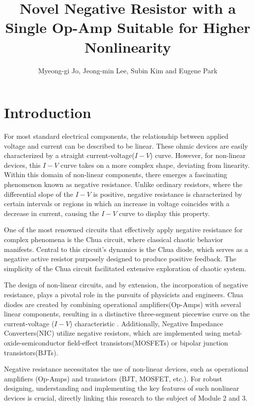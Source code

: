 \documentclass[12pt]{article}
\begin{document}
\title{Novel Negative Resistor with a Single Op-Amp Suitable for Higher Nonlinearity}

\author{Myeong-gi Jo, Jeong-min Lee, Subin Kim and Eugene Park}

\maketitle

\section{Introduction}


\quad For most standard electrical components, the relationship between applied voltage and current can be described to be linear. These ohmic devices are easily characterized by a straight current-voltage(\(I-V\)) curve. However, for non-linear devices, this \(I-V\) curve takes on a more complex shape, deviating from linearity. Within this domain of non-linear components, there emerges a fascinating phenomenon known as negative resistance. Unlike ordinary resistors, where the differential slope of the \(I-V\) is positive, negative resistance is characterized by certain intervals or regions in which an increase in voltage coincides with a decrease in current, causing the \(I-V\) curve to display this property.

One of the most renowned circuits that effectively apply negative resistance for complex phenomena is the Chua circuit, where classical chaotic behavior manifests. Central to this circuit's dynamics is the Chua diode, which serves as a negative active resistor purposely designed to produce positive feedback. The simplicity of the Chua circuit facilitated extensive exploration of chaotic system\cite{impact_chua}.

The design of non-linear circuits, and by extension, the incorporation of negative resistance, plays a pivotal role in the pursuits of physicists and engineers. Chua diodes are created by combining operational amplifiers(Op-Amps) with several linear components, resulting in a distinctive three-segment piecewise curve on the current-voltage ($I-V$) characteristic \cite{chua_circuit}. Additionally, Negative Impedance Converters(NIC) utilize negative resistors, which are implemented using metal-oxide-semiconductor field-effect transistors(MOSFETs) or bipolar junction transistors(BJTs)\cite{NIC_BJT,NIC_MOSFET,NIC_MOSFET2}.

Negative resistance necessitates the use of non-linear devices, such as operational amplifiers (Op-Amps) and transistors (BJT, MOSFET, etc.). For robust designing, understanding and implementing the key features of such nonlinear devices is crucial, directly linking this research to the subject of Module 2 and 3. 
\end{document}
